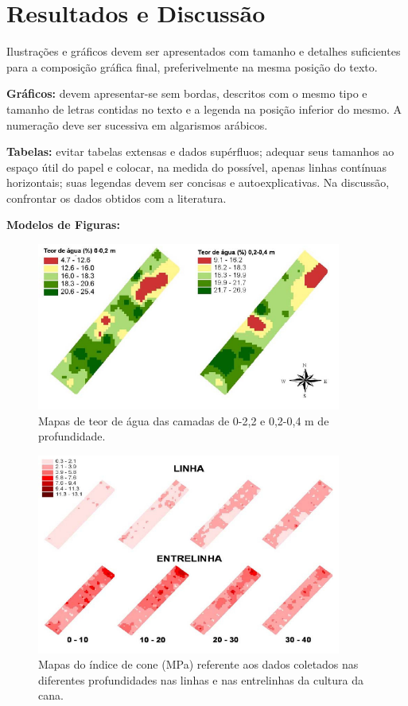 \section*{Resultados e Discussão}

Ilustrações e gráficos devem ser apresentados com tamanho e detalhes suficientes para a composição gráfica final, preferivelmente na mesma posição do texto.

\textbf{Gráficos:} devem apresentar-se sem bordas, descritos com o mesmo tipo e tamanho de letras contidas no texto e a legenda na posição inferior do mesmo. A numeração deve ser sucessiva em algarismos arábicos.

\textbf{Tabelas:} evitar tabelas extensas e dados supérfluos; adequar seus tamanhos ao espaço útil do papel e colocar, na medida do possível, apenas linhas contínuas horizontais; suas legendas devem ser concisas e autoexplicativas. Na discussão, confrontar os dados obtidos com a literatura.
\vspace{0.5cm}

\noindent\textbf{Modelos de Figuras:}


\begin{figure}[ht]
\centering
\includegraphics[width=10cm,angle=0]{imagens/grafico_1}
\caption{Mapas de teor de água das camadas de 0-2,2 e 0,2-0,4 m de profundidade.}
\label{fig:nome_referencia_figura1}
\end{figure}

\begin{figure}[ht]
\centering
\includegraphics[width=10cm,angle=0]{imagens/grafico_2.png}
\caption{Mapas do índice de cone (MPa) referente aos dados coletados nas diferentes profundidades nas linhas e nas entrelinhas da cultura da cana.}
\label{fig:nome_referencia_figura2}
\end{figure}

